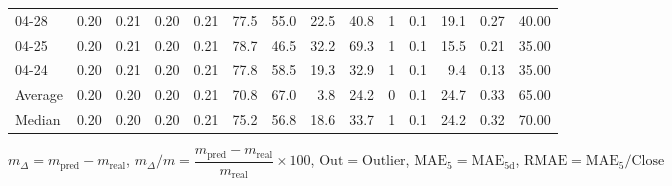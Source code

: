 \begin{threeparttable}
{\begin{tabular}{lrrrrrrrrrrrrr}
  04-28 &          0.20 &          0.21 &          0.20 &        0.21 &                77.5 &                55.0 &       22.5 &         40.8 &              1 &                 0.1 &             19.1 &            0.27 &                  40.00 \\
  04-25 &          0.20 &          0.21 &          0.20 &        0.21 &                78.7 &                46.5 &       32.2 &         69.3 &              1 &                 0.1 &             15.5 &            0.21 &                  35.00 \\
  04-24 &          0.20 &          0.21 &          0.20 &        0.21 &                77.8 &                58.5 &       19.3 &         32.9 &              1 &                 0.1 &              9.4 &            0.13 &                  35.00 \\
Average &          0.20 &          0.20 &          0.20 &        0.21 &                70.8 &                67.0 &        3.8 &         24.2 &              0 &                 0.1 &             24.7 &            0.33 &                  65.00 \\
 Median &          0.20 &          0.20 &          0.20 &        0.21 &                75.2 &                56.8 &       18.6 &         33.7 &              1 &                 0.1 &             24.2 &            0.32 &                  70.00 \\
\bottomrule
\end{tabular}
}
\begin{tablenotes}\footnotesize
\item $m_\Delta=m_{\text{pred}}-m_{\text{real}}$,
$m_\Delta/m=\dfrac{m_{\text{pred}}-m_{\text{real}}}{m_{\text{real}}}\times100$,
$\mathrm{Out}=\text{Outlier}$,
$\mathrm{MAE}_5=\mathrm{MAE}_{5\text{d}}$,
$\mathrm{RMAE}=\mathrm{MAE}_5/\text{Close}$
\end{tablenotes}
\end{threeparttable}
\endgroup

